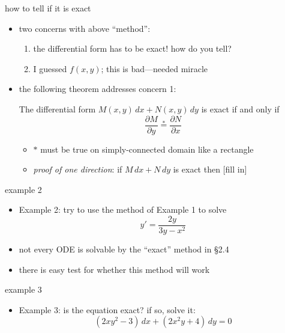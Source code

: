 \documentclass{beamer}
\begin{document}
\begin{frame}{how to tell if it is exact}

\begin{itemize}
\item two concerns with above ``method'':
    \begin{enumerate}
    \item the differential form has to be exact!  how do you tell?
    \item I guessed $f(x,y)$; this is bad---needed miracle
    \end{enumerate}
\item the following theorem addresses concern 1:
\begin{theorem}
The differential form $M(x,y)\,dx + N(x,y)\,dy$ is exact if and only if
    $$\frac{\partial M}{\partial y} \stackrel{\ast}{=} \frac{\partial N}{\partial x}$$
\end{theorem}
    \begin{itemize}
    \item $\ast$ must be true on simply-connected domain like a rectangle
    \item \emph{proof of one direction}: if $M\,dx + N\,dy$ is exact then [fill in]
    \end{itemize}

\vspace{20mm}
\end{itemize}
\end{frame}


\begin{frame}{example 2}

\begin{itemize}
\item Example 2: try to use the method of Example 1 to solve
    $$y' = \frac{2y}{3y-x^2}$$

\vspace{45mm}
\item not every ODE is solvable by the ``exact'' method in \S 2.4
\item there is easy test for whether this method will work
\end{itemize}
\end{frame}


\begin{frame}{example 3}

\begin{itemize}
\item Example 3: is the equation exact?  if so, solve it:
    $$(2xy^2-3)\,dx + (2x^2y+4)\,dy = 0$$
\end{itemize}

\vspace{60mm}
\end{frame}
\end{document}
